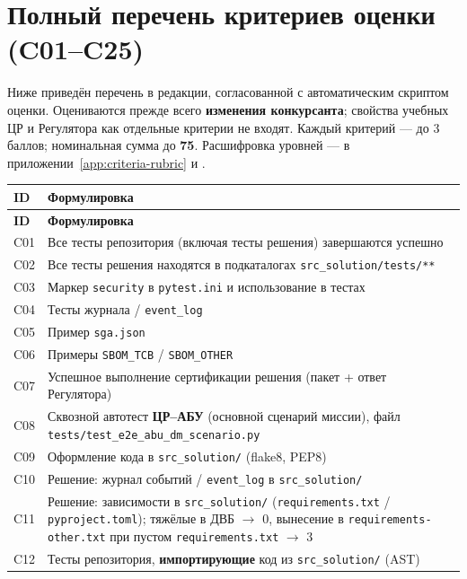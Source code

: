 \appendix

\chapter{Полный перечень критериев оценки (C01--C25)}
\label{app:criteria}

Ниже приведён перечень в редакции, согласованной с автоматическим скриптом оценки. Оцениваются прежде всего \textbf{изменения конкурсанта}; свойства учебных ЦР и Регулятора как отдельные критерии не входят. Каждый критерий --- до 3 баллов; номинальная сумма до \textbf{75}. Расшифровка уровней --- в приложении~\ref{app:criteria-rubric} и .

\begin{longtable}{@{}p{}p{}@{}}
\toprule
\textbf{ID} & \textbf{Формулировка} \\
\midrule
\endfirsthead
\toprule
\textbf{ID} & \textbf{Формулировка} \\
\midrule
\endhead
C01 & Все тесты репозитория (включая тесты решения) завершаются успешно \\
C02 & Все тесты решения находятся в подкаталогах \texttt{src\_solution/tests/**} \\
C03 & Маркер \texttt{security} в \texttt{pytest.ini} и использование в тестах \\
C04 & Тесты журнала / \texttt{event\_log} \\
C05 & Пример \texttt{sga.json} \\
C06 & Примеры \texttt{SBOM\_TCB} / \texttt{SBOM\_OTHER} \\
C07 & Успешное выполнение сертификации решения (пакет + ответ Регулятора) \\
C08 & Сквозной автотест \textbf{ЦР--АБУ} (основной сценарий миссии), файл \texttt{tests/test\_e2e\_abu\_dm\_scenario.py} \\
C09 & Оформление кода в \texttt{src\_solution/} (flake8, PEP8) \\
C10 & Решение: журнал событий / \texttt{event\_log} в \texttt{src\_solution/} \\
C11 & Решение: зависимости в \texttt{src\_solution/} (\texttt{requirements.txt} / \texttt{pyproject.toml}); тяжёлые в ДВБ $\rightarrow$ 0, вынесение в \texttt{requirements-other.txt} при пустом \texttt{requirements.txt} $\rightarrow$ 3 \\
C12 & Тесты репозитория, \textbf{импортирующие} код из \texttt{src\_solution/} (AST) \\

\end{longtable}
